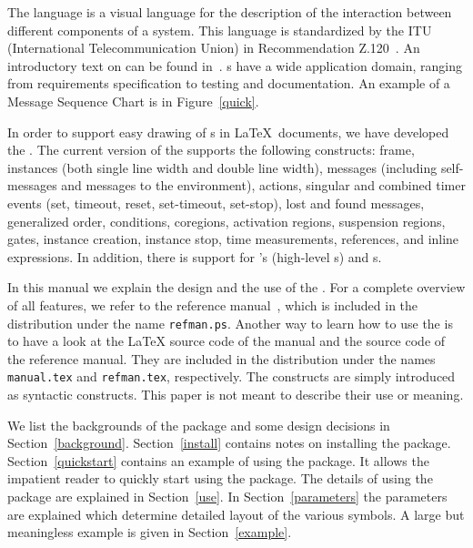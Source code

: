 \documentclass[12pt,a4paper]{article}
\begin{document}
The \MSC{} language is a visual language for the description of the
interaction between different components of a system.
This language is standardized by the ITU (International
Telecommunication Union) in Recommendation Z.120~\cite{z120}. An
introductory text on \MSC{} can be found
in~\cite{RudolphGrabowskiGraubmann96}. \MSC{}s have a
wide application domain, ranging from requirements specification to
testing and documentation.
An example of a Message Sequence Chart is in Figure~\ref{quick}.

In order to support easy drawing of \MSC{}s in \LaTeX\ documents, we have
developed the \mscpack.  The current version of the \mscpack{}
supports the following \MSC{} constructs: \MSC{} frame, instances (both
single line width and double line width), messages (including
self-messages and messages to the environment), actions, singular and
combined timer events (set, timeout, reset, set-timeout, set-stop),
lost and found messages, generalized order, conditions, coregions,
activation regions, suspension regions, gates, instance creation,
instance stop, time measurements, references, and inline
expressions. In addition, there is support for \HMSC{}'s (high-level
\MSC{}s) and \MSCdoc{}s.

In this manual we explain the design and the use of the \mscpack. For
a complete overview of all features, we refer to the reference
manual~\cite{BM02}, which is included in the distribution under the
name \verb+refman.ps+. Another way to learn how to use the \mscpack{}
is to have a look at the \LaTeX{} source code of the manual and the
source code of the reference manual. They are included in the
distribution under the names \verb+manual.tex+ and \verb+refman.tex+,
respectively.  The \MSC{} constructs are simply introduced as
syntactic constructs. This paper is not meant to describe their use or
meaning.

We list the backgrounds of the package and some design decisions in
Section~\ref{background}.
Section~\ref{install} contains notes on installing the
package. Section~\ref{quickstart} contains an example of using the
package. It allows the impatient reader to quickly start using the
package. The details of using the package are explained in
Section~\ref{use}. In Section~\ref{parameters} the parameters are
explained which determine detailed layout of the various symbols.
A large but meaningless example is given in
Section~\ref{example}.
\end{document}
